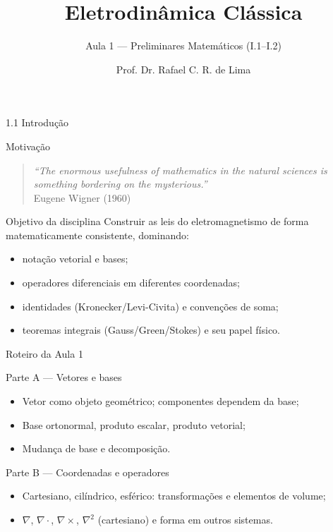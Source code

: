 \documentclass[aspectratio=169]{beamer}
\title[Eletrodinâmica Clássica]{Eletrodinâmica Clássica}
\subtitle{Aula 1 — Preliminares Matemáticos (I.1--I.2)}
\author{Prof. Dr. Rafael C. R. de Lima}
\institute{UDESC — CCT}
\date{}
\newcommand{\blue}[1]{\textcolor{myblue}{#1}}
\newcommand{\red}[1]{\textcolor{myred}{#1}}
\begin{document}
\begin{frame}
  \titlepage
\end{frame}

\begin{frame}[plain]
\centering
\vfill
{\Huge\blue{1.1 Introdução}}
\vfill
\end{frame}

\begin{frame}{Motivação}
\begin{quote}
\emph{``The enormous usefulness of mathematics in the natural sciences is something bordering on the mysterious.''}\\
\hfill Eugene Wigner (1960)
\end{quote}

\begin{block}{Objetivo da disciplina}
Construir as leis do eletromagnetismo de forma \red{matematicamente consistente}, dominando:
\begin{itemize}
  \item notação vetorial e bases;
  \item operadores diferenciais em diferentes coordenadas;
  \item identidades (Kronecker/Levi-Civita) e convenções de soma;
  \item teoremas integrais (Gauss/Green/Stokes) e seu papel físico.
\end{itemize}
\end{block}
\end{frame}

\begin{frame}{Roteiro da Aula 1}
\begin{block}{Parte A — Vetores e bases}
\begin{itemize}
  \item Vetor como objeto geométrico; componentes dependem da base;
  \item Base ortonormal, produto escalar, produto vetorial;
  \item Mudança de base e decomposição.
\end{itemize}
\end{block}

\begin{block}{Parte B — Coordenadas e operadores}
\begin{itemize}
  \item Cartesiano, cilíndrico, esférico: transformações e elementos de volume;
  \item $\nabla$, $\nabla\cdot$, $\nabla\times$, $\nabla^2$ (cartesiano) e forma em outros sistemas.
\end{itemize}
\end{block}
\end{frame}
\end{document}
